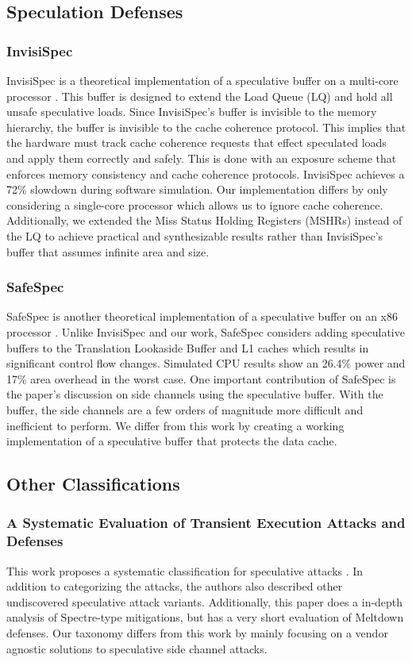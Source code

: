 \subsection{Speculation Defenses}

\subsubsection{InvisiSpec}

InvisiSpec is a theoretical implementation of a speculative buffer on a multi-core
processor \cite{b46}. This buffer is designed to extend the Load Queue (LQ) and hold all unsafe speculative loads.
Since InvisiSpec's buffer is invisible to the memory hierarchy, the buffer is
invisible to the cache coherence protocol. This implies that the hardware must track cache
coherence requests that effect speculated loads and apply them correctly and safely. This is
done with an exposure scheme that enforces memory consistency and cache coherence protocols.
InvisiSpec achieves a 72\% slowdown during software simulation. Our implementation differs by only
considering a single-core processor which allows us to ignore cache coherence. Additionally, we extended the Miss
Status Holding Registers (MSHRs) instead of the LQ to achieve practical and synthesizable results
rather than InvisiSpec's buffer that assumes infinite area and size.

\subsubsection{SafeSpec}

SafeSpec is another theoretical implementation of a speculative buffer on an x86 processor \cite{b29}.
Unlike InvisiSpec and our work, SafeSpec considers adding speculative buffers to the Translation Lookaside Buffer and 
L1 caches which results in significant control flow changes.
Simulated CPU results show an 26.4\% power and 17\% area overhead in the worst case. One
important contribution of SafeSpec is the paper's discussion on side channels using the speculative
buffer. With the buffer, the side channels are a few orders of magnitude more difficult and inefficient to perform.
We differ from this work by creating a working implementation of a speculative buffer that protects the data cache.

\subsection{Other Classifications}

\subsubsection{A Systematic Evaluation of Transient Execution Attacks and Defenses}

This work proposes a systematic classification for speculative attacks \cite{b48}. 
In addition to categorizing the attacks, the authors also described other undiscovered speculative attack variants.
Additionally, this paper does a in-depth analysis of Spectre-type mitigations, but has a very short evaluation of Meltdown defenses.
Our taxonomy differs from this work by mainly focusing on a vendor agnostic solutions to speculative side channel attacks.
